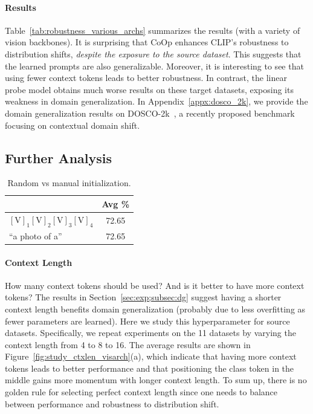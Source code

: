 \paragraph{Results}
Table~\ref{tab:robustness_various_archs} summarizes the results (with a variety of vision backbones). It is surprising that CoOp enhances CLIP's robustness to distribution shifts, \emph{despite the exposure to the source dataset}. This suggests that the learned prompts are also generalizable. Moreover, it is interesting to see that using fewer context tokens leads to better robustness. In contrast, the linear probe model obtains much worse results on these target datasets, exposing its weakness in domain generalization. In Appendix~\ref{appx:dosco_2k}, we provide the domain generalization results on DOSCO-2k~\citep{zhou2022device}, a recently proposed benchmark focusing on contextual domain shift.


\subsection{Further Analysis} \label{sec:exp;subsec:analysis}

\begin{table}[t]
    \tabstyle{5pt}
    \caption{Random vs manual initialization.}
    \label{tab:init}
    \begin{tabular}{l c}
    \toprule
     & Avg \% \\
    \midrule
    $[\text{V}]_1 [\text{V}]_2 [\text{V}]_3 [\text{V}]_4$ & 72.65 \\
    ``a photo of a'' & 72.65 \\
    \bottomrule
    \end{tabular}
\end{table}

\paragraph{Context Length}
How many context tokens should be used? And is it better to have more context tokens? The results in Section~\ref{sec:exp;subsec:dg} suggest having a shorter context length benefits domain generalization (probably due to less overfitting as fewer parameters are learned). Here we study this hyperparameter for source datasets. Specifically, we repeat experiments on the 11 datasets by varying the context length from 4 to 8 to 16. The average results are shown in Figure~\ref{fig:study_ctxlen_visarch}(a), which indicate that having more context tokens leads to better performance and that positioning the class token in the middle gains more momentum with longer context length. To sum up, there is no golden rule for selecting perfect context length since one needs to balance between performance and robustness to distribution shift.

